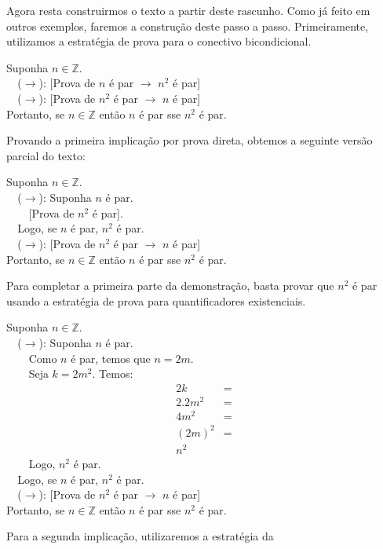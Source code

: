 \begin{Example}
Agora resta construirmos o texto a partir deste rascunho. Como já
feito em outros exemplos, faremos a construção deste passo a
passo. Primeiramente, utilizamos a estratégia de prova para o
conectivo bicondicional.
\begin{flushleft}
Suponha $n\in\mathbb{Z}$.\\
\verb|  |($\to$): [Prova de $n$ é par $\to$ $n^2$ é par]\\
\verb|  |($\to$): [Prova de $n^2$ é par $\to$ $n$ é par]\\
Portanto, se $n\in\mathbb{Z}$ então $n$ é par sse $n^2$ é par.
\end{flushleft}
Provando a primeira implicação por prova direta, obtemos a seguinte
versão parcial do texto:
\begin{flushleft}
Suponha $n\in\mathbb{Z}$.\\
\verb|  |($\to$): Suponha $n$ é par.\\
\verb|    |[Prova de $n^2$ é par].\\
\verb|  |Logo, se $n$ é par, $n^2$ é par.\\
\verb|  |($\to$): [Prova de $n^2$ é par $\to$ $n$ é par]\\
Portanto, se $n\in\mathbb{Z}$ então $n$ é par sse $n^2$ é par.
\end{flushleft}
Para completar a primeira parte da demonstração, basta provar que
$n^2$ é par usando a estratégia de prova para quantificadores
existenciais.
\begin{flushleft}
Suponha $n\in\mathbb{Z}$.\\
\verb|  |($\to$): Suponha $n$ é par.\\
\verb|    |Como $n$ é par, temos que $n = 2m$.\\
\verb|    |Seja $k = 2m^2$. Temos:\\
\[
\begin{array}{lc}
2k & = \\
2.2m^2 & = \\
4m^2 & = \\
(2m)^2 & = \\
n^2
\end{array}
\]\verb|    |Logo, $n^2$ é par.\\
\verb|  |Logo, se $n$ é par, $n^2$ é par.\\
\verb|  |($\to$): [Prova de $n^2$ é par $\to$ $n$ é par]\\
Portanto, se $n\in\mathbb{Z}$ então $n$ é par sse $n^2$ é par.
\end{flushleft}
Para a segunda implicação, utilizaremos a estratégia da

\end{Example}
